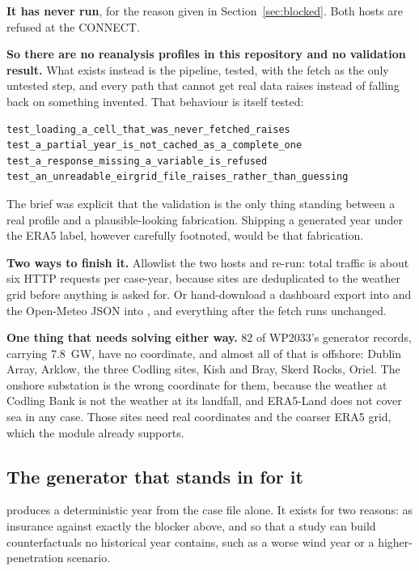 \documentclass[11pt,a4paper]{article}
\begin{document}
\textbf{It has never run}, for the reason given in Section~\ref{sec:blocked}.
Both hosts are refused at the CONNECT.

\textbf{So there are no reanalysis profiles in this repository and no
validation result.} What exists instead is the pipeline, tested, with the fetch
as the only untested step, and every path that cannot get real data raises
instead of falling back on something invented. That behaviour is itself
tested:

\begin{lstlisting}
test_loading_a_cell_that_was_never_fetched_raises
test_a_partial_year_is_not_cached_as_a_complete_one
test_a_response_missing_a_variable_is_refused
test_an_unreadable_eirgrid_file_raises_rather_than_guessing
\end{lstlisting}

The brief was explicit that the validation is the only thing standing between a
real profile and a plausible-looking fabrication. Shipping a generated year
under the ERA5 label, however carefully footnoted, would be that fabrication.

\textbf{Two ways to finish it.} Allowlist the two hosts and re-run: total
traffic is about six HTTP requests per case-year, because sites are
deduplicated to the weather grid before anything is asked for. Or hand-download
a dashboard export into  and the Open-Meteo JSON into
, and everything after the fetch runs unchanged.

\textbf{One thing that needs solving either way.} 82 of WP2033's generator
records, carrying 7.8~GW, have no coordinate, and almost all of that is
offshore: Dublin Array, Arklow, the three Codling sites, Kish and Bray, Skerd
Rocks, Oriel. The onshore substation is the wrong coordinate for them, because
the weather at Codling Bank is not the weather at its landfall, and ERA5-Land
does not cover sea in any case. Those sites need real coordinates and the
coarser ERA5 grid, which the module already supports.


\subsection{The generator that stands in for it}

 produces a deterministic year from the case file alone. It
exists for two reasons: as insurance against exactly the blocker above, and so
that a study can build counterfactuals no historical year contains, such as a
worse wind year or a higher-penetration scenario.
\end{document}
